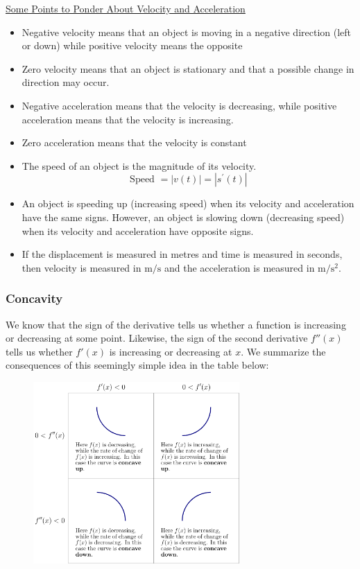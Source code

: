 \documentclass{article}
\begin{document}
\underline{Some Points to Ponder About Velocity and Acceleration}
\begin{itemize}
\item Negative velocity means that an object is moving in a negative direction (left or down) while positive velocity means the opposite
\item Zero velocity means that an object is stationary and that a possible change in direction may occur.
\item Negative acceleration means that the velocity is decreasing, while positive acceleration means that the velocity is increasing.
\item Zero acceleration means that the velocity is constant
\item The speed of an object is the magnitude of its velocity.
$$
\text {Speed }=|v(t)|=\left|s^{\prime}(t)\right|
$$
\item An object is speeding up (increasing speed) when its velocity and acceleration have the same signs. However, an object is slowing down (decreasing speed) when its velocity and acceleration have opposite signs.
\item If the displacement is measured in metres and time is measured in seconds, then velocity is measured in $\mathrm{m} / \mathrm{s}$ and the acceleration is measured in $\mathrm{m} / \mathrm{s}^2$.
\end{itemize}



\subsubsection*{Concavity}

We know that the sign of the derivative tells us whether a function is increasing or decreasing at some point. Likewise, the sign of the second derivative $f''(x)$ tells us whether $f'(x)$ is increasing or decreasing at $x$. We summarize the consequences of this seemingly simple idea in the table below:


\begin{figure}[ht]
    \centering
    \includegraphics[width=0.7\textwidth]{imgs/digInConcavityAnd2ndDerivTest-figure0.png}
\end{figure}
\end{document}
